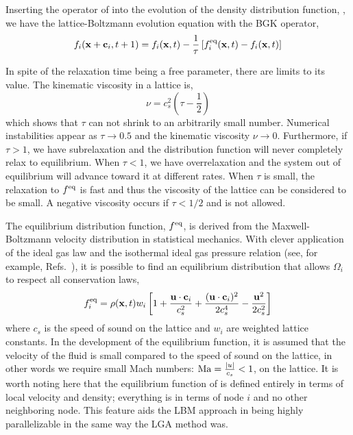 Inserting the operator of  into the evolution of the density distribution function, , we have the lattice-Boltzmann evolution equation with the BGK operator,
\begin{equation}\label{eq:lbm-bgk}
	f_i(\mathbf{x}+\mathbf{c}_i, t + 1) = f_i(\mathbf{x},t) - \frac{1}{\tau}\left[f_i^{\text{eq}}(\mathbf{x},t) - f_i(\mathbf{x},t)\right]
\end{equation}

In spite of the relaxation time being a free parameter, there are limits to its value. The kinematic viscosity in a lattice is,
\begin{equation}\label{eq:lbm-viscosity-relaxation-time}
	\nu = c_s^2\left(\tau-\frac{1}{2}\right)
\end{equation}
which shows that $\tau$ can not shrink to an arbitrarily small number. Numerical instabilities appear as $\tau \rightarrow 0.5$ and the kinematic viscosity $\nu \rightarrow 0$. Furthermore, if $\tau > 1$, we have subrelaxation and the distribution function will never completely relax to equilibrium. When $\tau < 1$, we have overrelaxation and the system out of equilibrium will advance toward it at different rates. When $\tau$ is small, the relaxation to $f^{\text{eq}}$ is fast and thus the viscosity of the lattice can be considered to be small. A negative viscosity occurs if $\tau < 1/2$ and is not allowed.\cite{Chopard2002,Chen1998a}

The equilibrium distribution function, $f^{\text{eq}}$, is derived from the Maxwell-Boltzmann velocity distribution in statistical mechanics. With clever application of the ideal gas law and the isothermal ideal gas pressure relation (see, for example, Refs.~\cite{Viggen2009,Chopard2002}), it is possible to find an equilibrium distribution that allows $\Omega_i$ to respect all conservation laws,
\begin{equation}\label{eq:equilib-dist-function}
	f_i^{\text{eq}} = \rho(\mathbf{x},t)w_i\left[1+\frac{\mathbf{u}\cdot\mathbf{c}_i}{c_s^2} + \frac{(\mathbf{u}\cdot\mathbf{c}_i)^2}{2c_s^4} - \frac{\mathbf{u}^2}{2c_s^2} \right]
\end{equation}
where $c_s$ is the speed of sound on the lattice and $w_i$ are weighted lattice constants. In the development of the equilibrium function, it is assumed that the velocity of the fluid is small compared to the speed of sound on the lattice, in other words we require small Mach numbers: $\mathrm{Ma} = \frac{|u|}{c_s} < 1$, on the lattice.\cite{qian1992lattice,Chen1998a} It is worth noting here that the equilibrium function of  is defined entirely in terms of local velocity and density; everything is in terms of node $i$ and no other neighboring node. This feature aids the LBM approach in being highly parallelizable in the same way the LGA method was.

